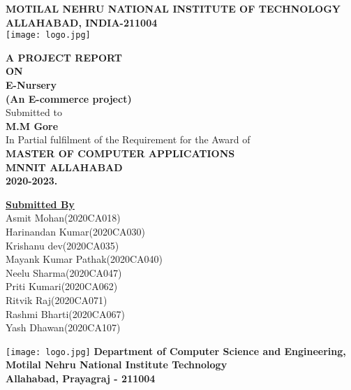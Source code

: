 \documentclass[12pt,a4paper]{report}
\begin{document}
\begin{center}
	\onehalfspacing
	\textbf{\large MOTILAL NEHRU NATIONAL INSTITUTE OF TECHNOLOGY ALLAHABAD, INDIA-211004\\} 
		\texttt{[image: logo.jpg]}
		\end{center}
		\begin{center}
			\textbf{A PROJECT REPORT\\ ON} 
			\break
			\textbf{
				\\E-Nursery
				\\(An E-commerce project)
			}  
			\\ Submitted to \\ 
			\textbf{M.M Gore} \break
			\onehalfspacing
			\\ In Partial fulfilment of the Requirement for the Award of
			\textbf{
				\\MASTER OF COMPUTER APPLICATIONS 
				\\MNNIT ALLAHABAD 
				\\2020-2023.\\
			}   
		\end{center}
		\vfill
		\begin{flushright}
			\onehalfspacing
			\textbf{\underline{Submitted By }}
			\\Asmit Mohan(2020CA018)
			\\Harinandan Kumar(2020CA030)
			\\Krishanu dev(2020CA035)
			\\Mayank Kumar Pathak(2020CA040)
			\\Neelu Sharma(2020CA047)
			\\Priti Kumari(2020CA062)
			\\Ritvik Raj(2020CA071)
			\\Rashmi Bharti(2020CA067)
			\\Yash Dhawan(2020CA107)
		\end{flushright}
												
		\pagebreak
												    
		\begin{center}
			\texttt{[image: logo.jpg]}
			\break
			\onehalfspacing
			\textbf{\large Department of Computer Science and Engineering,\\ Motilal Nehru National Institute Technology \\ Allahabad, Prayagraj - 211004}
		\end{center}
												
		\vspace{0.2in}
												
\end{document}
